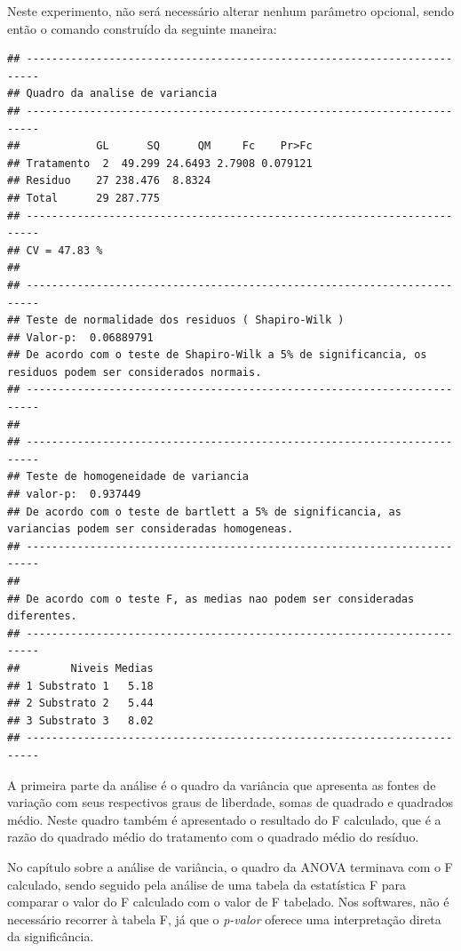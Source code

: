 \documentclass[
]{article}
\newenvironment{Shaded}{\begin{snugshade}}{\end{snugshade}}
\newcommand{\KeywordTok}[1]{\textcolor[rgb]{0.13,0.29,0.53}{\textbf{#1}}}
\newcommand{\NormalTok}[1]{#1}
\newcommand{\OperatorTok}[1]{\textcolor[rgb]{0.81,0.36,0.00}{\textbf{#1}}}
\begin{document}
Neste experimento, não será necessário alterar nenhum parâmetro opcional, sendo então o comando construído da seguinte maneira:

\begin{Shaded}
\end{Shaded}

\begin{verbatim}
## ------------------------------------------------------------------------
## Quadro da analise de variancia
## ------------------------------------------------------------------------
##            GL      SQ      QM     Fc    Pr>Fc
## Tratamento  2  49.299 24.6493 2.7908 0.079121
## Residuo    27 238.476  8.8324                
## Total      29 287.775                        
## ------------------------------------------------------------------------
## CV = 47.83 %
## 
## ------------------------------------------------------------------------
## Teste de normalidade dos residuos ( Shapiro-Wilk ) 
## Valor-p:  0.06889791 
## De acordo com o teste de Shapiro-Wilk a 5% de significancia, os residuos podem ser considerados normais.
## ------------------------------------------------------------------------
## 
## ------------------------------------------------------------------------
## Teste de homogeneidade de variancia 
## valor-p:  0.937449 
## De acordo com o teste de bartlett a 5% de significancia, as variancias podem ser consideradas homogeneas.
## ------------------------------------------------------------------------
## 
## De acordo com o teste F, as medias nao podem ser consideradas diferentes.
## ------------------------------------------------------------------------
##        Niveis Medias
## 1 Substrato 1   5.18
## 2 Substrato 2   5.44
## 3 Substrato 3   8.02
## ------------------------------------------------------------------------
\end{verbatim}

A primeira parte da análise é o quadro da variância que apresenta as fontes de variação com seus respectivos graus de liberdade, somas de quadrado e quadrados médio. Neste quadro também é apresentado o resultado do F calculado, que é a razão do quadrado médio do tratamento com o quadrado médio do resíduo.

No capítulo sobre a análise de variância, o quadro da ANOVA terminava com o F calculado, sendo seguido pela análise de uma tabela da estatística F para comparar o valor do F calculado com o valor de F tabelado. Nos softwares, não é necessário recorrer à tabela F, já que o \emph{p-valor} oferece uma interpretação direta da significância.
\end{document}
